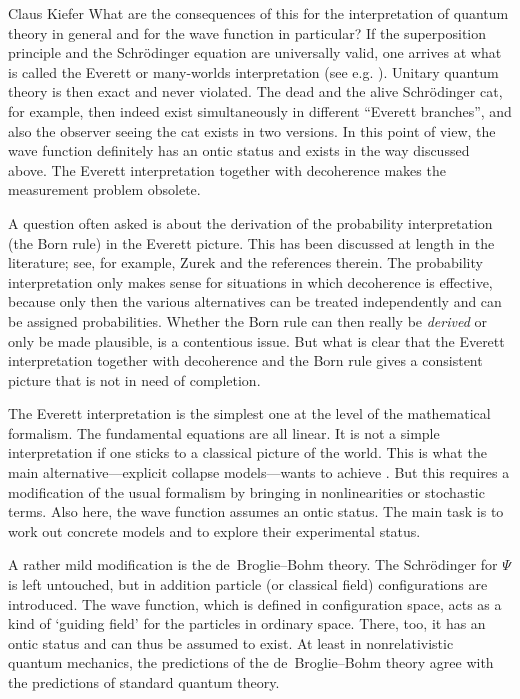 \begin{artengenv}{Claus Kiefer}
What are the consequences of this for the interpretation of quantum
theory in general and for the wave function in particular?
If the superposition principle and the Schr\"odinger equation are
universally valid, one arrives at what is called the Everett or
many-worlds interpretation (see e.g. \cite{despagnat_veiled_1995,zeh_strange_2016}).
Unitary
quantum theory is then exact and never violated. The dead and the
alive Schr\"odinger cat, for example, then indeed exist simultaneously
in different ``Everett branches'', and also the observer seeing the
cat exists in two versions. In this point of view, the wave function
definitely has an ontic status and exists in the way discussed above.
The Everett interpretation together with decoherence makes the
measurement problem obsolete.

A question often asked is about the derivation of the probability
interpretation (the Born rule) in the Everett picture. This has been
discussed at length in the literature; see, for example, Zurek
\parencite*{zurek_wojciech_hubert_quantum_2018}
and the references therein. The probability interpretation only makes
sense for situations in which decoherence is effective, because only
then the various alternatives can be treated independently and can be
assigned probabilities. Whether the Born rule can then really be {\em
  derived} or only be made plausible, is a contentious issue. But what is
clear that the Everett interpretation together with decoherence and
the Born rule gives a consistent picture that is not in need
of completion. 

The Everett interpretation is the simplest one at the level of the
mathematical formalism. The fundamental equations are all linear. It
is not a simple interpretation if one sticks to a classical picture of
the world. This is what the main alternative---explicit collapse
models---wants to achieve \parencite[see e.g.][]{bassi_models_2013}. But this
requires a modification of the usual formalism by bringing in
nonlinearities or stochastic terms. Also here, the wave function
assumes an ontic status. The main task is to work out concrete models
and to explore their experimental status. 

A rather mild modification is the de~Broglie--Bohm
theory. The Schr\"odinger for $\Psi$ is left untouched, but
in addition particle (or classical field) configurations are
introduced. The wave function, which is defined in configuration space,
acts as a kind of `guiding field' for the particles in ordinary
space. There, too, it has an ontic status and can thus be assumed to
exist. At least in nonrelativistic quantum mechanics, the predictions
of the  de~Broglie--Bohm theory agree with the predictions of standard quantum
theory.


\end{artengenv}
